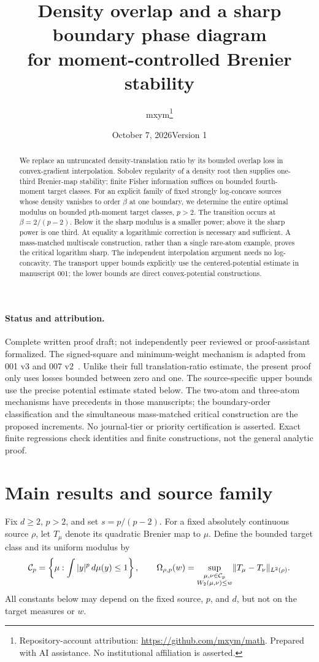 \documentclass[11pt]{article}
\title{Density overlap and a sharp boundary phase diagram\\for moment-controlled Brenier stability}
\author{mxym\thanks{Repository-account attribution: \url{https://github.com/mxym/math}. Prepared with AI assistance. No institutional affiliation is asserted.}}
\date{October 7, 2026\quad Version 1}
\theoremstyle{remark}\newtheorem{remark}[theorem]{Remark}
\begin{document}
\maketitle
\begin{abstract}
We replace an untruncated density-translation ratio by its bounded overlap loss in convex-gradient interpolation. Sobolev regularity of a density root then supplies one-third Brenier-map stability; finite Fisher information suffices on bounded fourth-moment target classes. For an explicit family of fixed strongly log-concave sources whose density vanishes to order $\beta$ at one boundary, we determine the entire optimal modulus on bounded $p$th-moment target classes, $p>2$. The transition occurs at $\beta=2/(p-2)$. Below it the sharp modulus is a smaller power; above it the sharp power is one third. At equality a logarithmic correction is necessary and sufficient. A mass-matched multiscale construction, rather than a single rare-atom example, proves the critical logarithm sharp. The independent interpolation argument needs no log-concavity. The transport upper bounds explicitly use the centered-potential estimate in manuscript 001; the lower bounds are direct convex-potential constructions.
\end{abstract}
\paragraph{Status and attribution.}
Complete written proof draft; not independently peer reviewed or proof-assistant formalized. The signed-square and minimum-weight mechanism is adapted from 001 v3 and 007 v2~\cite{M001,M007}. Unlike their full translation-ratio estimate, the present proof only uses losses bounded between zero and one. The source-specific upper bounds use the precise potential estimate stated below. The two-atom and three-atom mechanisms have precedents in those manuscripts; the boundary-order classification and the simultaneous mass-matched critical construction are the proposed increments. No journal-tier or priority certification is asserted. Exact finite regressions check identities and finite constructions, not the general analytic proof.

\section{Main results and source family}
Fix $d\ge2$, $p>2$, and set $s=p/(p-2)$. For a fixed absolutely continuous source $\rho$, let $T_\mu$ denote its quadratic Brenier map to $\mu$. Define the bounded target class and its uniform modulus by
\[
 \mathcal C_p=\left\{\mu:\int|y|^p\,d\mu(y)\le1\right\},\qquad
 \Omega_{\rho,p}(w)=\sup_{\substack{\mu,\nu\in\mathcal C_p\\W_2(\mu,\nu)\le w}}
                  \lVert T_\mu-T_\nu\rVert_{L^2(\rho)}.
\]
All constants below may depend on the fixed source, $p$, and $d$, but not on the target measures or $w$.
\end{document}
